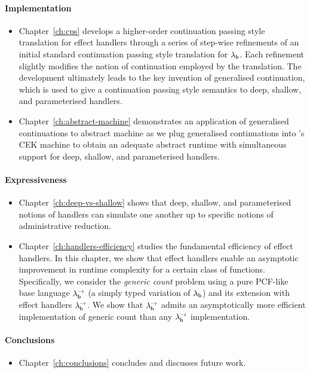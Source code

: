 \documentclass[12pt,phd,lfcs,twoside,openright,logo,leftchapter,normalheadings]{infthesis}
\theoremstyle{plain}
\theoremstyle{definition}
\begin{document}
\paragraph{Implementation}
\begin{itemize}
  \item Chapter~\ref{ch:cps} develops a higher-order continuation passing
style translation for effect handlers through a series of step-wise
refinements of an initial standard continuation passing style
translation for $\lambda_{\mathsf{b}}$. Each refinement slightly modifies the notion
of continuation employed by the translation. The development
ultimately leads to the key invention of generalised continuation,
which is used to give a continuation passing style semantics to deep,
shallow, and parameterised handlers.

  \item Chapter~\ref{ch:abstract-machine} demonstrates an application of
generalised continuations to abstract machine as we plug generalised
continuations into \citeauthor{FelleisenF86}'s CEK machine to obtain
an adequate abstract runtime with simultaneous support for deep,
shallow, and parameterised handlers.
\end{itemize}

\paragraph{Expressiveness}
\begin{itemize}
  \item Chapter~\ref{ch:deep-vs-shallow} shows that deep, shallow, and
parameterised notions of handlers can simulate one another up to
specific notions of administrative reduction.

  \item Chapter~\ref{ch:handlers-efficiency} studies the fundamental efficiency of effect
handlers. In this chapter, we show that effect handlers enable an
asymptotic improvement in runtime complexity for a certain class of
functions. Specifically, we consider the \emph{generic count} problem
using a pure PCF-like base language $\lambda^\rightarrow_{\mathsf{b}}$ (a simply typed variation
of $\lambda_{\mathsf{b}}$) and its extension with effect handlers $\lambda^\rightarrow_{\mathsf{h}}$.
%
We show that $\lambda^\rightarrow_{\mathsf{h}}$ admits an asymptotically more efficient
implementation of generic count than any $\lambda^\rightarrow_{\mathsf{b}}$ implementation.
%
\end{itemize}

\paragraph{Conclusions}
\begin{itemize}
  \item Chapter~\ref{ch:conclusions} concludes and discusses future work.
\end{itemize}
\end{document}
